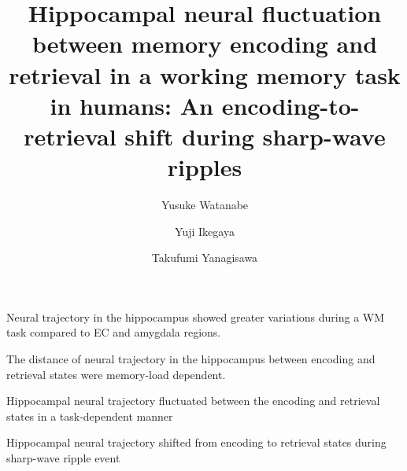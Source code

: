 \documentclass[final,3p,times,twocolumn]{elsarticle}
\begin{document}
\begin{frontmatter}
\begin{highlights}
\item Neural trajectory in the hippocampus showed greater variations during a WM task compared to EC and amygdala regions.
\item The distance of neural trajectory in the hippocampus between encoding and retrieval states were memory-load dependent.
\item Hippocampal neural trajectory fluctuated between the encoding and retrieval states in a task-dependent manner
\item Hippocampal neural trajectory shifted from encoding to retrieval states during sharp-wave ripple event
\end{highlights}
\title{Hippocampal neural fluctuation between memory encoding and retrieval in a working memory task in humans:  An encoding-to-retrieval shift during sharp-wave ripples}

\author[1]{Yusuke Watanabe}
\author[2,3,4]{Yuji Ikegaya}
\author[1,5]{Takufumi Yanagisawa}

\address[1]{Institute for Advanced Cocreation studies, Osaka University, 2-2 Yamadaoka, Suita, 565-0871, Osaka, Japan}
\address[2]{Graduate School of Pharmaceutical Sciences, The University of Tokyo, 7-3-1 Hongo, Tokyo, 113-0033, Japan}
\address[3]{Institute for AI and Beyond, The University of Tokyo, 7-3-1 Hongo, Tokyo, 113-0033, Japan}
\address[4]{Center for Information and Neural Networks, National Institute of Information and Communications Technology, 1-4 Yamadaoka, Suita City, 565-0871, Osaka, Japan}
\address[5]{Department of Neurosurgery, Osaka University Graduate School of Medicine, 2-2 Yamadaoka, Osaka, 565-0871, Japan}



\end{frontmatter}
\end{document}
